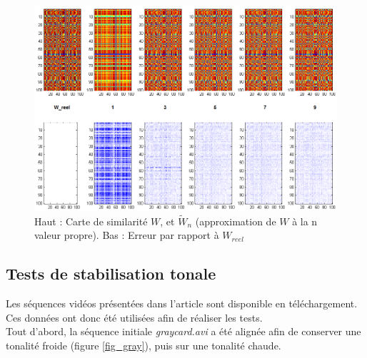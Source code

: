 \begin{figure}[H]
\centering
\includegraphics[width =\textwidth]{Chapters/Images/eigenvalues}
\caption{Haut : Carte de similarité $W$, et $\tilde{W}_{n}$ (approximation de $W$ à la n valeur propre). Bas : Erreur par rapport à $W_{reel}$}
\label{fig_nystrom_results}
\end{figure}


\subsection{Tests de stabilisation tonale}
Les séquences vidéos présentées dans l'article \cite{farbman2011tonal} sont disponible en téléchargement. Ces données ont donc été utilisées afin de réaliser les tests.\\

Tout d'abord, la séquence initiale \textit{graycard.avi} a été alignée afin de conserver une tonalité froide (figure \ref{fig_gray}), puis sur une tonalité chaude.

